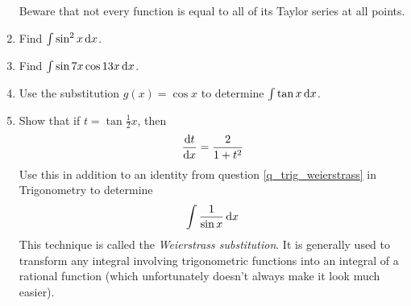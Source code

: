 \begin{enumerate}
  Beware that not every function is equal to all of its Taylor series at all
  points.
 \item
  Find \(\integ{\sin^2 x}{x}\).
 \item
  Find \(\integ{\sin 7x \cos 13 x}{x}\).
 \item
  Use the substitution \(g(x) = \cos x\) to determine \(\integ{\tan x}{x}\).
 \item
  Show that if \(t = \tan \frac 12 x\), then
  \begin{equation*}
   \dv<t>{x} = \frac 2{1 + t^2}
  \end{equation*}
  Use this in addition to an identity from question \ref{q_trig_weierstrass}
  in Trigonometry to determine
  \begin{equation*}
   \integ{\frac 1{\sin x}}{x}
  \end{equation*}
  This technique is called the \emph{Weierstrass substitution}. It is generally
  used to transform any integral involving trigonometric functions into an
  integral of a rational function (which unfortunately doesn't always make it
  look much easier).
\end{enumerate}
